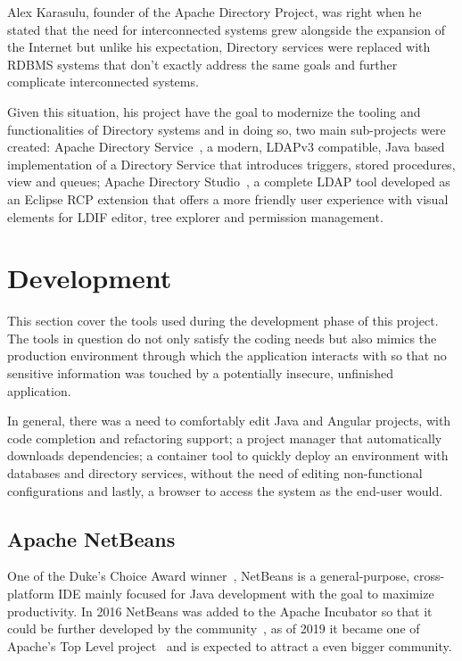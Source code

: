 Alex Karasulu, founder of the Apache Directory Project, was right when he stated that the need for interconnected systems grew alongside the expansion of the Internet but unlike his expectation, Directory services were replaced with \gls{RDBMS} systems that don't exactly address the same goals and further complicate interconnected systems\cite{apachedp}.

Given this situation, his project have the goal to modernize the tooling and functionalities of Directory systems and in doing so, two main sub-projects were created: Apache Directory Service~\cite{apachedservice}, a modern, \gls{LDAP}v3 compatible, Java based implementation of a Directory Service that introduces triggers, stored procedures, view and queues; Apache Directory Studio~\cite{apacheds}, a complete \gls{LDAP} tool developed as an Eclipse \gls{RCP} extension that offers a more friendly user experience with visual elements for  \gls{LDIF} editor, tree explorer and permission management.

\section{Development}\label{development}
This section cover the tools used during the development phase of this project. The tools in question do not only satisfy the coding needs but also mimics the production environment through which the application interacts with so that no sensitive information was touched by a potentially insecure, unfinished application.

In general, there was a need to comfortably edit Java and Angular projects, with code completion and refactoring support; a project manager that automatically downloads dependencies; a container tool to quickly deploy an environment with databases and directory services, without the need of editing non-functional configurations and lastly, a browser to access the system as the end-user would.

\subsection{Apache NetBeans}\label{netbeans}
One of the Duke's Choice Award winner~\cite{dukechoice}, NetBeans is a general-purpose, cross-platform \gls{IDE} mainly focused for Java development with the goal to maximize productivity. In 2016 NetBeans was added to the Apache Incubator so that it could be further developed by the community~\cite{incubation}, as of 2019 it became one of Apache's Top Level project~\cite{graduation} and is expected to attract a even bigger community.

